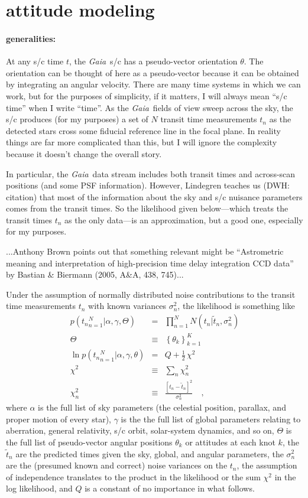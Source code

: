 \documentclass[12pt]{article}
\newcommand{\project}[1]{\textsl{#1}}
\newcommand{\gaia}{\project{Gaia}}
\begin{document}
\section{attitude modeling}

\paragraph{generalities:}
At any s/c time $t$, the \gaia\ s/c has a pseudo-vector orientation
$\theta$.  The orientation can be thought of here as a pseudo-vector
because it can be obtained by integrating an angular velocity.  There
are many time systems in which we can work, but for the purposes of
simplicity, if it matters, I will always mean ``s/c time'' when I
write ``time''.  As the \gaia\ fields of view sweep across the sky,
the s/c produces (for my purposes) a set of $N$ transit time
measurements $t_n$ as the detected stars cross some fiducial reference
line in the focal plane.  In reality things are far more complicated
than this, but I will ignore the complexity because it doesn't change
the overall story.

In particular, the \gaia\ data stream includes both transit times and
across-scan positions (and some PSF information).  However, Lindegren
teaches us (DWH: citation) that most of the information about the sky
and s/c nuisance parameters comes from the transit times.  So the
likelihood given below---which treats the transit times $t_n$ as the
only data---is an approximation, but a good one, especially for my
purposes.

...Anthony Brown points out that something relevant might be
``Astrometric meaning and interpretation of high-precision time delay
integration CCD data'' by Bastian \& Biermann (2005, A\&A, 438, 745)...

Under the assumption of normally distributed noise contributions to
the transit time measurements $t_n$ with known variances $\sigma^2_n$,
the likelihood is something like
\begin{eqnarray}\displaystyle
p({t_n}_{n=1}^N|\alpha,\gamma,\Theta) &=& \prod_{n=1}^N N(t_n|\tilde{t}_n, \sigma^2_n)
\\
\Theta &\equiv& \left\{\theta_k \right\}_{k=1}^K
\\
\ln p({t_n}_{n=1}^N|\alpha,\gamma,\theta) &=& Q + \frac{1}{2}\,\chi^2
\\
\chi^2 &\equiv& \sum_n \chi^2_n
\\
\chi^2_n &\equiv& \frac{[t_n - \tilde{t}_n]^2}{\sigma^2_n}
\quad ,
\end{eqnarray}
where $\alpha$ is the full list of sky parameters (the celestial
position, parallax, and proper motion of every star), $\gamma$ is the
the full list of global parameters relating to aberration, general
relativity, s/c orbit, solar-system dynamics, and so on, $\Theta$ is
the full list of pseudo-vector angular positions $\theta_k$ or
attitudes at each knot $k$, the $\tilde{t}_n$ are the predicted times
given the sky, global, and angular parameters, the $\sigma^2_n$ are
the (presumed known and correct) noise variances on the $t_n$, the
assumption of independence translates to the product in the likelihood
or the sum $\chi^2$ in the log likelihood, and $Q$ is a constant of no
importance in what follows.
\end{document}
